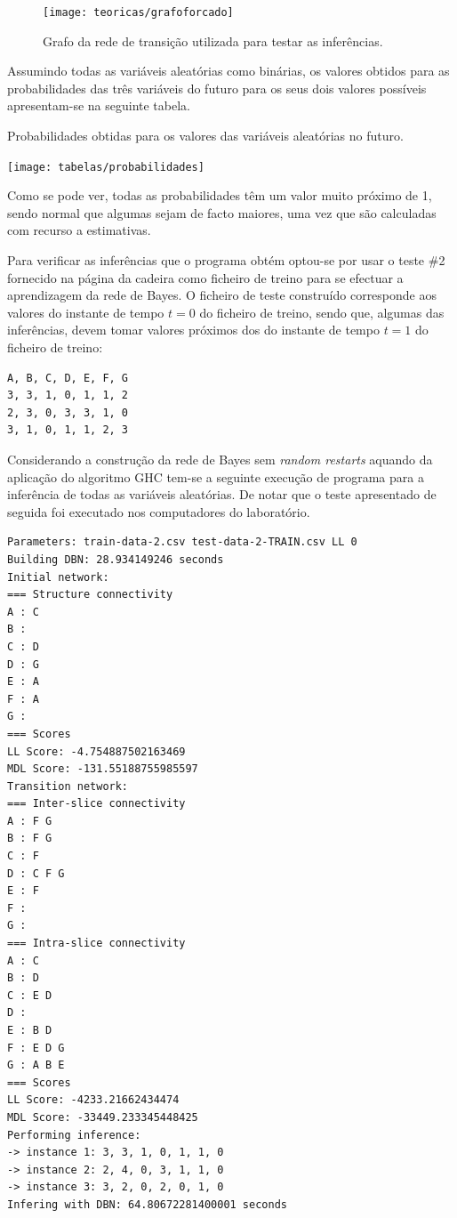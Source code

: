 \documentclass[10pt]{article}
\numberwithin{equation}{section}
\begin{document}
\begin{figure}[H]
	\centering
	\texttt{[image: teoricas/grafoforcado]}
	\caption{Grafo da rede de transição utilizada para testar as inferências.}
	\vspace{-0.8em}
	\label{fig:grafoforcado}
\end{figure}

Assumindo todas as variáveis aleatórias como binárias, os valores obtidos para as probabilidades das três variáveis do futuro para os seus dois valores possíveis apresentam-se na seguinte tabela.

\begin{table}[H]
	\centering
	\caption{Probabilidades obtidas para os valores das variáveis aleatórias no futuro.}
	\vspace{-1.5mm}
	\texttt{[image: tabelas/probabilidades]}
\end{table}

\vspace{-1.5mm}
Como se pode ver, todas as probabilidades têm um valor muito próximo de 1, sendo normal que algumas sejam de facto maiores, uma vez que são calculadas com recurso a estimativas.

Para verificar as inferências que o programa obtém optou-se por usar o teste \#2 fornecido na página da cadeira como ficheiro de treino para se efectuar a aprendizagem da rede de Bayes. O ficheiro de teste construído corresponde aos valores do instante de tempo $t = 0$ do ficheiro de treino, sendo que, algumas das inferências, devem tomar valores próximos dos do instante de tempo $t = 1$ do ficheiro de treino:

\begin{lstlisting}
A, B, C, D, E, F, G
3, 3, 1, 0, 1, 1, 2
2, 3, 0, 3, 3, 1, 0
3, 1, 0, 1, 1, 2, 3
\end{lstlisting}

Considerando a construção da rede de Bayes sem \textit{random restarts} aquando da aplicação do algoritmo GHC tem-se a seguinte execução de programa para a inferência de todas as variáveis aleatórias. De notar que o teste apresentado de seguida foi executado nos computadores do laboratório.

\begin{lstlisting}
Parameters: train-data-2.csv test-data-2-TRAIN.csv LL 0
Building DBN: 28.934149246 seconds
Initial network:
=== Structure connectivity
A : C
B :
C : D
D : G
E : A
F : A
G :
=== Scores
LL Score: -4.754887502163469
MDL Score: -131.55188755985597
Transition network:
=== Inter-slice connectivity
A : F G
B : F G
C : F
D : C F G
E : F
F :
G :
=== Intra-slice connectivity
A : C
B : D
C : E D
D :
E : B D
F : E D G
G : A B E
=== Scores
LL Score: -4233.21662434474
MDL Score: -33449.233345448425
Performing inference:
-> instance 1: 3, 3, 1, 0, 1, 1, 0
-> instance 2: 2, 4, 0, 3, 1, 1, 0
-> instance 3: 3, 2, 0, 2, 0, 1, 0
Infering with DBN: 64.80672281400001 seconds
\end{lstlisting}
\end{document}

